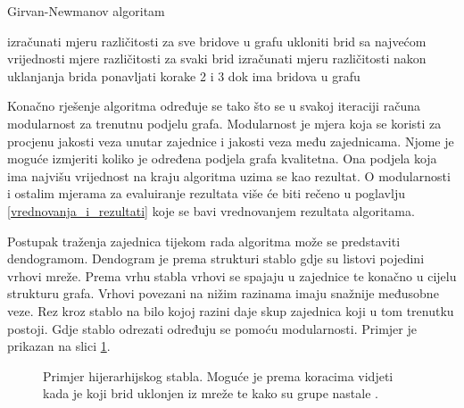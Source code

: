 \bigskip
\begin{algorithm}
\caption{Girvan-Newmanov algoritam}
\begin{algorithmic}[1]
	\STATE izračunati mjeru različitosti za sve bridove u grafu
	\STATE ukloniti brid sa najvećom vrijednosti mjere različitosti
	\STATE za svaki brid izračunati mjeru različitosti nakon uklanjanja brida
	\STATE ponavljati korake 2 i 3 dok ima bridova u grafu
\end{algorithmic}
\end{algorithm}
\bigskip

Konačno rješenje algoritma određuje se tako što se u svakoj iteraciji računa modularnost za trenutnu podjelu grafa. Modularnost je mjera koja se koristi za procjenu jakosti veza unutar zajednice i jakosti veza među zajednicama. Njome je moguće izmjeriti koliko je određena podjela grafa kvalitetna. Ona podjela koja ima najvišu vrijednost na kraju algoritma uzima se kao rezultat. O modularnosti i ostalim mjerama za evaluiranje rezultata više će biti rečeno u poglavlju \ref{vrednovanja_i_rezultati} koje se bavi vrednovanjem rezultata algoritama.


Postupak traženja zajednica tijekom rada algoritma može se predstaviti dendogramom. Dendogram je prema strukturi stablo gdje su listovi pojedini vrhovi mreže. Prema vrhu stabla vrhovi se spajaju u zajednice te konačno u cijelu strukturu grafa. Vrhovi povezani na nižim razinama imaju snažnije međusobne veze. Rez kroz stablo na bilo kojoj razini daje skup zajednica koji u tom trenutku postoji. Gdje stablo odrezati određuju se pomoću modularnosti. Primjer je prikazan na slici \ref{fig:dendogram}.

\begin{figure}
	\caption{Primjer hijerarhijskog stabla. Moguće je prema koracima vidjeti kada je koji brid uklonjen iz mreže te kako su grupe nastale \cite{girvan2002community}.}
	\label{fig:dendogram}
\end{figure}

